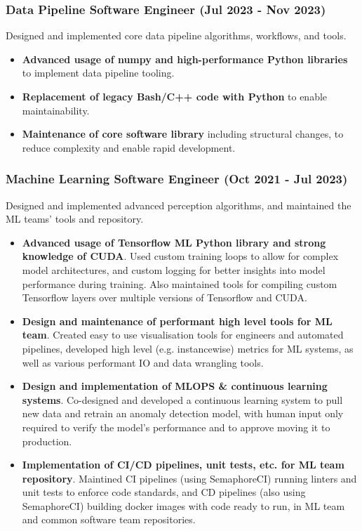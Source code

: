 \documentclass[12pt]{article}
\begin{document}
\begin{FlushLeft}
  \subsubsection{Data Pipeline Software Engineer (Jul 2023 - Nov 2023)}
  Designed and implemented core data pipeline algorithms, workflows, and tools. \\

  \begin{itemize}
  \item \textbf{Advanced usage of numpy and high-performance Python libraries} to implement data pipeline tooling. \\
  \item \textbf{Replacement of legacy Bash/C++ code with Python} to enable maintainability. \\
  \item \textbf{Maintenance of core software library} including structural changes, to reduce complexity and enable rapid development. \\
  \end{itemize}

  \subsubsection{Machine Learning Software Engineer (Oct 2021 - Jul 2023)}
  Designed and implemented advanced perception algorithms, and maintained the ML teams' tools and repository. \\

  \begin{itemize}
  \item \textbf{Advanced usage of Tensorflow ML Python library and strong knowledge of CUDA}. Used custom training loops to allow for complex model architectures, and custom logging for better insights into model performance during training. Also maintained tools for compiling custom Tensorflow layers over multiple versions of Tensorflow and CUDA. \\
  \item \textbf{Design and maintenance of performant high level tools for ML team}. Created easy to use visualisation tools for engineers and automated pipelines, developed high level (e.g. instancewise) metrics for ML systems, as well as various performant IO and data wrangling tools. \\
  \item \textbf{Design and implementation of MLOPS \& continuous learning systems}. Co-designed and developed a continuous learning system to pull new data and retrain an anomaly detection model, with human input only required to verify the model's performance and to approve moving it to production.
  \item \textbf{Implementation of CI/CD pipelines, unit tests, etc. for ML team repository}. Maintined CI pipelines (using SemaphoreCI) running linters and unit tests to enforce code standards, and CD pipelines (also using SemaphoreCI) building docker images with code ready to run, in ML team and common software team repositories.
  \end{itemize}


\end{FlushLeft}
\end{document}
